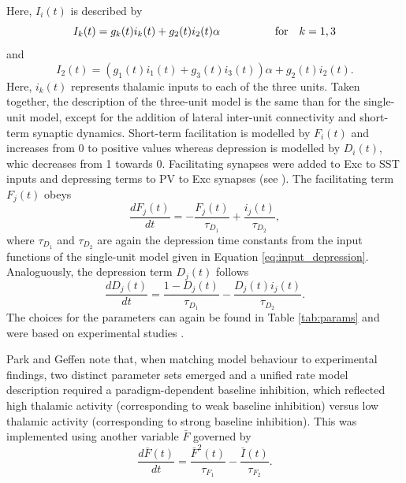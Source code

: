 Here, $I_i(t)$ is described by
\begin{equation}
 I_k(t) = g_k(t)i_k(t)+g_2(t)i_2(t)\alpha \hspace{5em} \textnormal{for} \hspace{1em} k=1,3
\end{equation}
and
\begin{equation}
 I_2(t) = (g_1(t)i_1(t) + g_3(t)i_3(t))\alpha + g_2(t)i_2(t).
\end{equation}
Here, $i_k(t)$ represents thalamic inputs to each of the three units. Taken together, the description of the three-unit model is the same than 
for the single-unit model, except for the addition of lateral inter-unit connectivity and short-term synaptic dynamics. Short-term facilitation 
is modelled by $F_i(t)$ and increases from 0 to positive values whereas depression is modelled by $D_i(t)$, whic decreases from 1 towards 0. 
Facilitating synapses were added to Exc to SST inputs and depressing terms to PV to Exc synapses (see \supercite{beierlein2003two}). The facilitating
term $F_j(t)$ obeys
\begin{equation}
 \frac{dF_j(t)}{dt} = -\frac{F_j(t)}{\tau_{D_1}} + \frac{i_j(t)}{\tau_{D_2}},
\end{equation}
where $\tau_{D_1}$ and $\tau_{D_2}$ are again the depression time constants from the input functions of the single-unit model given in 
Equation \ref{eq:input_depression}. Analoguously, the depression term $D_j(t)$ follows
\begin{equation}
 \frac{dD_j(t)}{dt} = \frac{1-D_j(t)}{\tau_{D_1}} - \frac{D_j(t)i_j(t)}{\tau_{D_2}}.
\end{equation}
The choices for the parameters can again be found in Table \ref{tab:params} and were based on experimental studies \supercite{tsodyks1997paradoxical,
abbott1997synaptic,wehr2005synaptic}. 

Park and Geffen note that, when matching model behaviour to experimental findings, two distinct parameter sets emerged and a unified rate model 
description required a paradigm-dependent baseline inhibition, which reflected high thalamic activity (corresponding to weak baseline inhibition)
versus low thalamic activity (corresponding to strong baseline inhibition). This was implemented using another variable $\bar{F}$ governed by
\begin{equation}
  \frac{d\bar{F}(t)}{dt} = \frac{\bar{F}^2(t)}{\tau_{F_1}} - \frac{\bar{I}(t)}{\tau_{F_2}}.
\end{equation}

